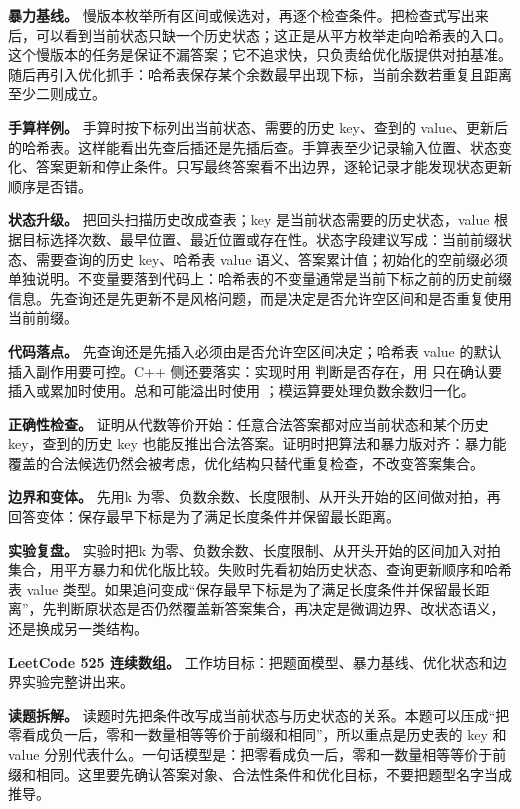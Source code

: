 \textbf{暴力基线。} 慢版本枚举所有区间或候选对，再逐个检查条件。把检查式写出来后，可以看到当前状态只缺一个历史状态；这正是从平方枚举走向哈希表的入口。这个慢版本的任务是保证不漏答案；它不追求快，只负责给优化版提供对拍基准。随后再引入优化抓手：哈希表保存某个余数最早出现下标，当前余数若重复且距离至少二则成立。

\textbf{手算样例。} 手算时按下标列出当前状态、需要的历史 key、查到的 value、更新后的哈希表。这样能看出先查后插还是先插后查。手算表至少记录输入位置、状态变化、答案更新和停止条件。只写最终答案看不出边界，逐轮记录才能发现状态更新顺序是否错。

\textbf{状态升级。} 把回头扫描历史改成查表；key 是当前状态需要的历史状态，value 根据目标选择次数、最早位置、最近位置或存在性。状态字段建议写成：当前前缀状态、需要查询的历史 key、哈希表 value 语义、答案累计值；初始化的空前缀必须单独说明。不变量要落到代码上：哈希表的不变量通常是当前下标之前的历史前缀信息。先查询还是先更新不是风格问题，而是决定是否允许空区间和是否重复使用当前前缀。

\textbf{代码落点。} 先查询还是先插入必须由是否允许空区间决定；哈希表 value 的默认插入副作用要可控。C++ 侧还要落实：实现时用  判断是否存在，用  只在确认要插入或累加时使用。总和可能溢出时使用 ；模运算要处理负数余数归一化。

\textbf{正确性检查。} 证明从代数等价开始：任意合法答案都对应当前状态和某个历史 key，查到的历史 key 也能反推出合法答案。证明时把算法和暴力版对齐：暴力能覆盖的合法候选仍然会被考虑，优化结构只替代重复检查，不改变答案集合。

\textbf{边界和变体。} 先用k 为零、负数余数、长度限制、从开头开始的区间做对拍，再回答变体：保存最早下标是为了满足长度条件并保留最长距离。

\textbf{实验复盘。} 实验时把k 为零、负数余数、长度限制、从开头开始的区间加入对拍集合，用平方暴力和优化版比较。失败时先看初始历史状态、查询更新顺序和哈希表 value 类型。如果追问变成“保存最早下标是为了满足长度条件并保留最长距离”，先判断原状态是否仍然覆盖新答案集合，再决定是微调边界、改状态语义，还是换成另一类结构。

\noindent\textbf{LeetCode 525 连续数组。} 工作坊目标：把题面模型、暴力基线、优化状态和边界实验完整讲出来。

\textbf{读题拆解。} 读题时先把条件改写成当前状态与历史状态的关系。本题可以压成“把零看成负一后，零和一数量相等等价于前缀和相同”，所以重点是历史表的 key 和 value 分别代表什么。一句话模型是：把零看成负一后，零和一数量相等等价于前缀和相同。这里要先确认答案对象、合法性条件和优化目标，不要把题型名字当成推导。

